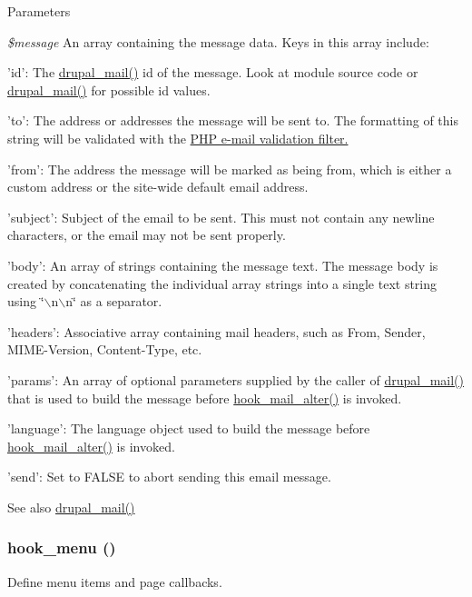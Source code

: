 \begin{DoxyParams}{Parameters}
\item[{\em \$message}]An array containing the message data. Keys in this array include:
\begin{DoxyItemize}
\item 'id': The \hyperlink{mail_8inc_ab80781fd7273975a77cbbd13300eddbf}{drupal\_\-mail()} id of the message. Look at module source code or \hyperlink{mail_8inc_ab80781fd7273975a77cbbd13300eddbf}{drupal\_\-mail()} for possible id values.
\item 'to': The address or addresses the message will be sent to. The formatting of this string will be validated with the \hyperlink{}{PHP e-\/mail validation filter. }
\item 'from': The address the message will be marked as being from, which is either a custom address or the site-\/wide default email address.
\item 'subject': Subject of the email to be sent. This must not contain any newline characters, or the email may not be sent properly.
\item 'body': An array of strings containing the message text. The message body is created by concatenating the individual array strings into a single text string using \char`\"{}$\backslash$n$\backslash$n\char`\"{} as a separator.
\item 'headers': Associative array containing mail headers, such as From, Sender, MIME-\/Version, Content-\/Type, etc.
\item 'params': An array of optional parameters supplied by the caller of \hyperlink{mail_8inc_ab80781fd7273975a77cbbd13300eddbf}{drupal\_\-mail()} that is used to build the message before \hyperlink{group__hooks_gaad1d55a8e7b359933f462a9ca5b2ede0}{hook\_\-mail\_\-alter()} is invoked.
\item 'language': The language object used to build the message before \hyperlink{group__hooks_gaad1d55a8e7b359933f462a9ca5b2ede0}{hook\_\-mail\_\-alter()} is invoked.
\item 'send': Set to FALSE to abort sending this email message.
\end{DoxyItemize}\end{DoxyParams}
\begin{DoxySeeAlso}{See also}
\hyperlink{mail_8inc_ab80781fd7273975a77cbbd13300eddbf}{drupal\_\-mail()} 
\end{DoxySeeAlso}
\hypertarget{group__hooks_ga5c95244fea59b25666e409759e133ded}{
\subsubsection[{hook\_\-menu}]{\setlength{\rightskip}{0pt plus 5cm}hook\_\-menu ()}}
\label{group__hooks_ga5c95244fea59b25666e409759e133ded}
Define menu items and page callbacks.

